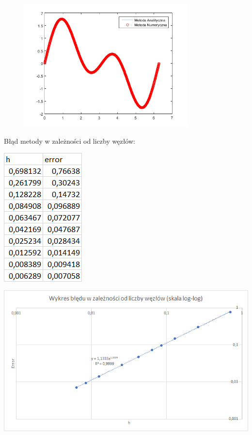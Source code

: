 \begin{figure}[!ht]
	\begin{center}
		\includegraphics[width=0.8\textwidth]{Lab3/charts/zad1/1000.png}
	\end{center}
\end{figure}

\newpage

Błąd metody w zależności od liczby węzłów:

\includegraphics{Lab3/charts/zad1/error_dane.png}

\includegraphics{Lab3/charts/zad1/error.png}

